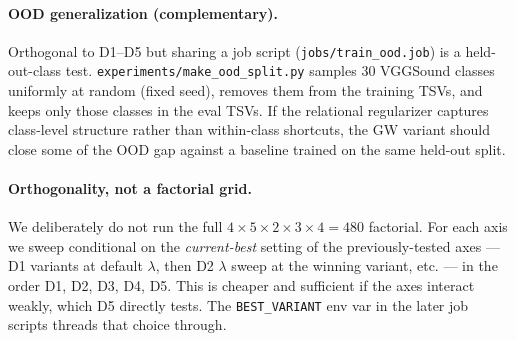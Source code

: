 \paragraph*{OOD generalization (complementary).}
Orthogonal to D1--D5 but sharing a job script
(\texttt{jobs/train\_ood.job}) is a held-out-class test.
\texttt{experiments/make\_ood\_split.py} samples 30 VGGSound
classes uniformly at random (fixed seed), removes them from the
training TSVs, and keeps only those classes in the eval TSVs. If
the relational regularizer captures class-level structure rather
than within-class shortcuts, the GW variant should close some of
the OOD gap against a baseline trained on the same held-out split.

\paragraph{Orthogonality, not a factorial grid.}
We deliberately do not run the full $4 \times 5 \times 2 \times 3
\times 4 = 480$ factorial. For each axis we sweep conditional on
the \emph{current-best} setting of the previously-tested axes ---
D1 variants at default $\lambda$, then D2 $\lambda$ sweep at the
winning variant, etc. --- in the order D1, D2, D3, D4, D5. This is
cheaper and sufficient if the axes interact weakly, which D5
directly tests. The \texttt{BEST\_VARIANT} env var in the later
job scripts threads that choice through.
